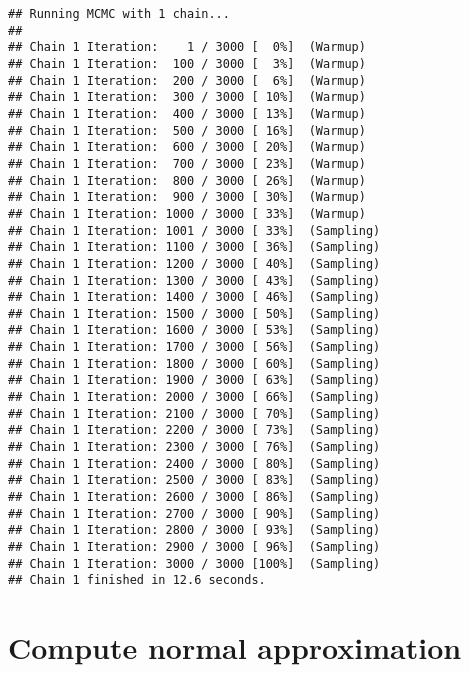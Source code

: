 \documentclass[
]{article}
\newenvironment{Shaded}{\begin{snugshade}}{\end{snugshade}}
\newcommand{\AttributeTok}[1]{\textcolor[rgb]{0.13,0.29,0.53}{#1}}
\newcommand{\FunctionTok}[1]{\textcolor[rgb]{0.13,0.29,0.53}{\textbf{#1}}}
\newcommand{\NormalTok}[1]{#1}
\newcommand{\OtherTok}[1]{\textcolor[rgb]{0.56,0.35,0.01}{#1}}
\newcommand{\SpecialCharTok}[1]{\textcolor[rgb]{0.81,0.36,0.00}{\textbf{#1}}}
\newcommand{\StringTok}[1]{\textcolor[rgb]{0.31,0.60,0.02}{#1}}
\begin{document}
\begin{verbatim}
## Running MCMC with 1 chain...
## 
## Chain 1 Iteration:    1 / 3000 [  0%]  (Warmup) 
## Chain 1 Iteration:  100 / 3000 [  3%]  (Warmup) 
## Chain 1 Iteration:  200 / 3000 [  6%]  (Warmup) 
## Chain 1 Iteration:  300 / 3000 [ 10%]  (Warmup) 
## Chain 1 Iteration:  400 / 3000 [ 13%]  (Warmup) 
## Chain 1 Iteration:  500 / 3000 [ 16%]  (Warmup) 
## Chain 1 Iteration:  600 / 3000 [ 20%]  (Warmup) 
## Chain 1 Iteration:  700 / 3000 [ 23%]  (Warmup) 
## Chain 1 Iteration:  800 / 3000 [ 26%]  (Warmup) 
## Chain 1 Iteration:  900 / 3000 [ 30%]  (Warmup) 
## Chain 1 Iteration: 1000 / 3000 [ 33%]  (Warmup) 
## Chain 1 Iteration: 1001 / 3000 [ 33%]  (Sampling) 
## Chain 1 Iteration: 1100 / 3000 [ 36%]  (Sampling) 
## Chain 1 Iteration: 1200 / 3000 [ 40%]  (Sampling) 
## Chain 1 Iteration: 1300 / 3000 [ 43%]  (Sampling) 
## Chain 1 Iteration: 1400 / 3000 [ 46%]  (Sampling) 
## Chain 1 Iteration: 1500 / 3000 [ 50%]  (Sampling) 
## Chain 1 Iteration: 1600 / 3000 [ 53%]  (Sampling) 
## Chain 1 Iteration: 1700 / 3000 [ 56%]  (Sampling) 
## Chain 1 Iteration: 1800 / 3000 [ 60%]  (Sampling) 
## Chain 1 Iteration: 1900 / 3000 [ 63%]  (Sampling) 
## Chain 1 Iteration: 2000 / 3000 [ 66%]  (Sampling) 
## Chain 1 Iteration: 2100 / 3000 [ 70%]  (Sampling) 
## Chain 1 Iteration: 2200 / 3000 [ 73%]  (Sampling) 
## Chain 1 Iteration: 2300 / 3000 [ 76%]  (Sampling) 
## Chain 1 Iteration: 2400 / 3000 [ 80%]  (Sampling) 
## Chain 1 Iteration: 2500 / 3000 [ 83%]  (Sampling) 
## Chain 1 Iteration: 2600 / 3000 [ 86%]  (Sampling) 
## Chain 1 Iteration: 2700 / 3000 [ 90%]  (Sampling) 
## Chain 1 Iteration: 2800 / 3000 [ 93%]  (Sampling) 
## Chain 1 Iteration: 2900 / 3000 [ 96%]  (Sampling) 
## Chain 1 Iteration: 3000 / 3000 [100%]  (Sampling) 
## Chain 1 finished in 12.6 seconds.
\end{verbatim}

\begin{Shaded}
\end{Shaded}

\hypertarget{compute-normal-approximation}{%
\section{Compute normal
approximation}\label{compute-normal-approximation}}
\end{document}
